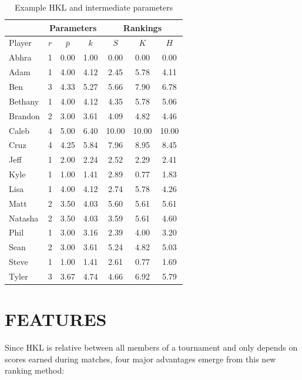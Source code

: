 \documentclass[letterpaper, 10 pt, conference]{ieeeconf}  %
\begin{document}
\begin{table}[hb]
        \begin{tabular}{lccc|ccc}
                \toprule
                        & \multicolumn{3}{c}{Parameters} & \multicolumn{3}{c}{Rankings} \\
                \midrule
                Player  & $r$   & $\bar{p}$ & $k$ & $S$ & $K$   & $H$ \\
                \midrule
                Abhra	& 1	& 0.00	& 1.00	& 0.00	& 0.00	& 0.00 \\
                Adam	& 1	& 4.00	& 4.12	& 2.45	& 5.78	& 4.11 \\
                Ben	& 3	& 4.33	& 5.27	& 5.66	& 7.90	& 6.78 \\
                Bethany	& 1	& 4.00	& 4.12	& 4.35	& 5.78	& 5.06 \\
                Brandon	& 2	& 3.00	& 3.61	& 4.09	& 4.82	& 4.46 \\
                Caleb	& 4	& 5.00	& 6.40	& 10.00	& 10.00	& 10.00 \\
                Cruz	& 4	& 4.25	& 5.84	& 7.96	& 8.95	& 8.45 \\
                Jeff	& 1	& 2.00	& 2.24	& 2.52	& 2.29	& 2.41 \\
                Kyle	& 1	& 1.00	& 1.41	& 2.89	& 0.77	& 1.83 \\
                Lisa	& 1	& 4.00	& 4.12	& 2.74	& 5.78	& 4.26 \\
                Matt	& 2	& 3.50	& 4.03	& 5.60	& 5.61	& 5.61 \\
                Natasha	& 2	& 3.50	& 4.03	& 3.59	& 5.61	& 4.60 \\
                Phil	& 1	& 3.00	& 3.16	& 2.39	& 4.00	& 3.20 \\
                Sean	& 2	& 3.00	& 3.61	& 5.24	& 4.82	& 5.03 \\
                Steve	& 1	& 1.00	& 1.41	& 2.61	& 0.77	& 1.69 \\
                Tyler	& 3	& 3.67	& 4.74	& 4.66	& 6.92	& 5.79 \\
                \bottomrule
        \end{tabular}
        \centering
        \caption{Example HKL and intermediate parameters}
        \label{tab:example-ratings}
\end{table}

\section{FEATURES}
Since HKL is relative between all members of a tournament and only depends on scores earned during matches, four major advantages emerge from this new ranking method:
\end{document}

